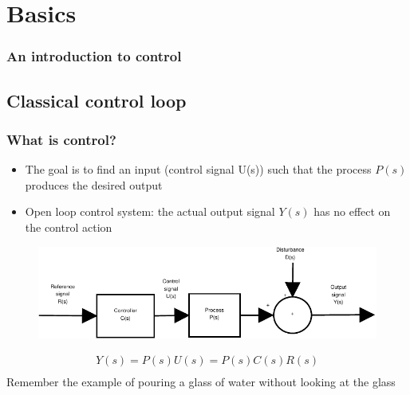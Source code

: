 \section{Basics}
\begin{frame}
\frametitle{An introduction to control}
\end{frame}

\subsection[Classical control loop]{Classical control loop}
\begin{frame}
\frametitle{What is control?}
\begin{itemize}
	\item The goal is to find an input (control signal U(s)) such that the process $P(s)$ produces the desired output
	\item Open loop control system: the actual output signal $Y(s)$ has no effect on the control action
\end{itemize}
\vspace{-1em}
\begin{figure}
	\centering
	\includegraphics[width=0.8\linewidth]{Open-Loop}
	\label{fig:Open-Loop}
\end{figure}
\begin{align*}
	Y(s) = P(s)U(s) = P(s)C(s)R(s) \\
\end{align*}
Remember the example of pouring a glass of water without looking at the glass
\end{frame}


